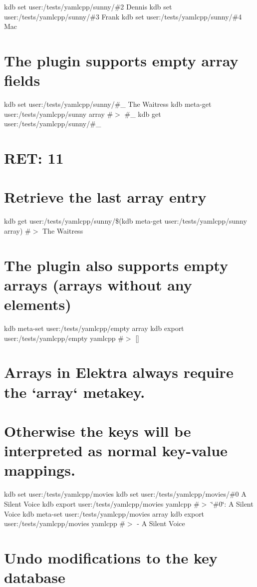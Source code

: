 kdb set user\+:/tests/yamlcpp/sunny/\#2 Dennis kdb set user\+:/tests/yamlcpp/sunny/\#3 Frank kdb set user\+:/tests/yamlcpp/sunny/\#4 Mac\hypertarget{autotoc_md807_autotoc_md828}{}\section{The plugin supports empty array fields}\label{autotoc_md807_autotoc_md828}
kdb set user\+:/tests/yamlcpp/sunny/\#\+\_ \textquotesingle{}The Waitress\textquotesingle{} kdb meta-\/get user\+:/tests/yamlcpp/sunny array \#$>$ \#\+\_ kdb get user\+:/tests/yamlcpp/sunny/\#\+\_ \hypertarget{autotoc_md807_autotoc_md829}{}\section{R\+E\+T\+: 11}\label{autotoc_md807_autotoc_md829}
\hypertarget{autotoc_md807_autotoc_md830}{}\section{Retrieve the last array entry}\label{autotoc_md807_autotoc_md830}
kdb get user\+:/tests/yamlcpp/sunny/\$(kdb meta-\/get user\+:/tests/yamlcpp/sunny array) \#$>$ The Waitress\hypertarget{autotoc_md807_autotoc_md831}{}\section{The plugin also supports empty arrays (arrays without any elements)}\label{autotoc_md807_autotoc_md831}
kdb meta-\/set user\+:/tests/yamlcpp/empty array \textquotesingle{}\textquotesingle{} kdb export user\+:/tests/yamlcpp/empty yamlcpp \#$>$ \mbox{[}\mbox{]}\hypertarget{autotoc_md807_autotoc_md832}{}\section{Arrays in Elektra always require the `array` metakey.}\label{autotoc_md807_autotoc_md832}
\hypertarget{autotoc_md807_autotoc_md833}{}\section{Otherwise the keys will be interpreted as normal key-\/value mappings.}\label{autotoc_md807_autotoc_md833}
kdb set user\+:/tests/yamlcpp/movies kdb set user\+:/tests/yamlcpp/movies/\#0 \textquotesingle{}A Silent Voice\textquotesingle{} kdb export user\+:/tests/yamlcpp/movies yamlcpp \#$>$ \char`\"{}\#0\char`\"{}\+: A Silent Voice kdb meta-\/set user\+:/tests/yamlcpp/movies array \textquotesingle{}\textquotesingle{} kdb export user\+:/tests/yamlcpp/movies yamlcpp \#$>$ -\/ A Silent Voice\hypertarget{autotoc_md807_autotoc_md834}{}\section{Undo modifications to the key database}\label{autotoc_md807_autotoc_md834}
